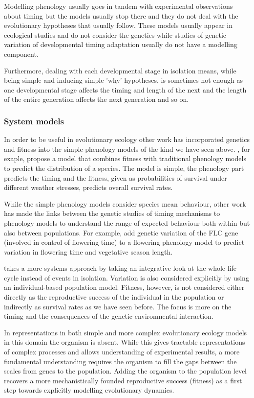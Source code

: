 Modelling phenology usually goes in tandem with experimental observations about
timing but the models usually stop there and they do not deal with the
evolutionary hypotheses that usually follow. These models usually appear in
ecological studies and do not consider the genetics while studies of genetic
variation of developmental timing adaptation usually do not have a modelling
component.

Furthermore, dealing with each developmental stage in isolation means, while
being simple and inducing simple 'why' hypotheses, is sometimes not enough as one
developmental stage affects the timing and length of the next and the length of
the entire generation affects the next generation and so on.

\subsubsection*{System models}
In order to be useful in evolutionary ecology other work has incorporated
genetics and fitness into the simple phenology models of the kind we have seen
above. \citet{chuine_phenology_2001}, for exaple, propose a model that combines
fitness with traditional phenology models to predict the distribution of a
species. The model is simple, the phenology part predicts the timing and the
fitness, given as probabilities of survival under different weather stresses,
predicts overall survival rates.

While the simple phenology models consider species mean behaviour, other work
has made the links between the genetic studies of timing mechanisms to phenology
models to understand the range of expected behaviour both within but also
between populations. For example, \citet{wilczek_effects_2009} add genetic
variation of the FLC gene (involved in control of flowering time) to a flowering
phenology model to predict variation in flowering time and vegetative season
length.

\citet{burghardt_modeling_2015} takes a more systems approach by taking an
integrative look at the whole life cycle instead of events in
isolation. Variation is also considered explicitly by using an individual-based
population model. Fitness, however, is not considered either directly as the
reproductive success of the individual in the population or indirectly as
survival rates as we have seen before. The focus is more on the timing and the
consequences of the genetic environmental interaction.

In representations in both simple and more complex evolutionary ecology models
in this domain the organism is absent. While this gives tractable
representations of complex processes and allows understanding of experimental
results, a more fundamental understanding requires the organism to fill the gaps
between the scales from genes to the population. Adding the organism to the
population level recovers a more mechanistically founded reproductive success
(fitness) as a first step towards explicitly modelling evolutionary dynamics.


